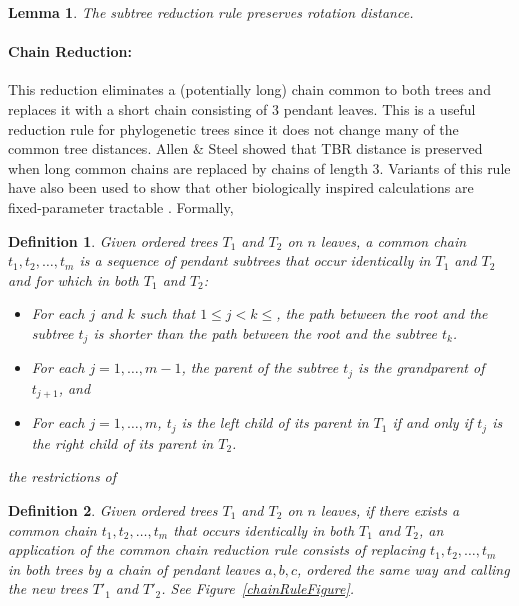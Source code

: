 \documentclass[12pt]{article}
\newtheorem{lemma}[theorem]{Lemma}
\newtheorem{definition}{Definition}
\begin{document}
\begin{lemma}  \cite{stt}  \label{lemsubtree}
The subtree reduction rule preserves
rotation distance.
\end{lemma}




\paragraph{Chain Reduction:}  
This reduction eliminates a (potentially long) chain common to both trees and replaces it with
a short chain consisting of $3$ pendant leaves.
This is a  useful reduction rule for phylogenetic trees since 
it does not change many of the common tree distances.
Allen \& Steel \cite{allenSteel} showed that
TBR  distance is preserved when long common chains
are replaced by chains of length 3.  Variants of this
rule have also been used to show that other biologically inspired
calculations are fixed-parameter tractable \cite{uSPRfpt,bordewichSemple,Bordewich2007}.
Formally, 
\begin{definition}
Given ordered trees $T_1$ and $T_2$ on $n$
leaves, a {\em common chain}  $t_1,t_2,\ldots,t_m$ is a sequence of pendant subtrees that occur 
identically in $T_1$ and $T_2$ and for which  in both $T_1$ and $T_2$:
\begin{itemize}
\itemsep 0pt
	\item For each $j$ and $k$ such that $1\leq j < k \leq$, 
		the path between the root and the subtree $t_j$ is shorter
		than the path between the root and the subtree $t_k$.
	\item For each $j=1,\ldots,m-1$, the parent of the subtree $t_j$ is 
		the grandparent of $t_{j+1}$, and
	\item For each $j=1,\ldots,m$, $t_j$ is the left child of its parent in $T_1$
		if and only if  $t_j$ is the right child of its parent in $T_2$.
\end{itemize}
the restrictions of 
\end{definition}
\begin{definition}
Given ordered trees $T_1$ and $T_2$ on $n$
leaves, if 
there exists a common chain $t_1,t_2,\ldots,t_m$ that occurs identically in both $T_1$
and $T_2$, an application of the {\em common chain reduction rule} consists of replacing 
$t_1,t_2,\ldots,t_m$ in both trees by a chain of pendant leaves $a,b,c$, ordered the same way and 
calling the new trees $T'_1$ and $T'_2$.   
See Figure~\ref{chainRuleFigure}.
\end{definition}
\end{document}
